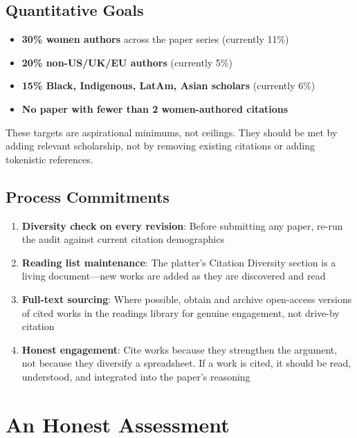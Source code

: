 \documentclass[10pt,letterpaper,twocolumn]{article}
\begin{document}
\subsection{Quantitative Goals}

\begin{itemize}
  \item \textbf{30\% women authors} across the paper series (currently 11\%)
  \item \textbf{20\% non-US/UK/EU authors} (currently 5\%)
  \item \textbf{15\% Black, Indigenous, LatAm, Asian scholars} (currently 6\%)
  \item \textbf{No paper with fewer than 2 women-authored citations}
\end{itemize}

These targets are aspirational minimums, not ceilings. They should be met by adding relevant scholarship, not by removing existing citations or adding tokenistic references.

\subsection{Process Commitments}

\begin{enumerate}
  \item \textbf{Diversity check on every revision}: Before submitting any paper, re-run the audit against current citation demographics
  \item \textbf{Reading list maintenance}: The platter's Citation Diversity section is a living document---new works are added as they are discovered and read
  \item \textbf{Full-text sourcing}: Where possible, obtain and archive open-access versions of cited works in the readings library for genuine engagement, not drive-by citation
  \item \textbf{Honest engagement}: Cite works because they strengthen the argument, not because they diversify a spreadsheet. If a work is cited, it should be read, understood, and integrated into the paper's reasoning
\end{enumerate}


\section{An Honest Assessment}
\end{document}
